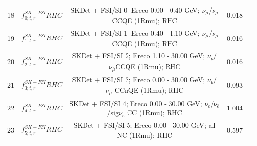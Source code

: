 {\begin{table}
\begin{tabular}{| c | c | c | c | c |}
18    &  $f_{0; t, r}^{SK+FSI}RHC$    & SKDet + FSI/SI  0; Ereco 0.00 - 0.40 GeV; $\nu_{\mu}$/$\nu_{\bar{\mu}}$ CCQE (1Rmu); RHC             & 0.018      \\ 
19    &  $f_{1; t, r}^{SK+FSI}RHC$    & SKDet + FSI/SI  1; Ereco  0.40 - 1.10 GeV; $\nu_{\mu}$/$\nu_{\bar{\mu}}$ CCQE (1Rmu); RHC             & 0.016      \\ 
20    &  $f_{2; t, r}^{SK+FSI}RHC$    & SKDet + FSI/SI  2; Ereco  1.10 - 30.00 GeV; $\nu_{\mu}$/$\nu_{\bar{\mu}}$CCQE (1Rmu); RHC            & 0.016      \\ 
21    &  $f_{3; t, r}^{SK+FSI}RHC$    & SKDet + FSI/SI  3; Ereco  0.00 - 30.00 GeV; $\nu_{\mu}$/$\nu_{\bar{\mu}}$ CCnQE (1Rmu); RHC           & 0.093      \\ 
22    &  $f_{4; t, r}^{SK+FSI}RHC$    & SKDet + FSI/SI  4; Ereco  0.00 - 30.00 GeV; $\nu_e$/$\nu_{\bar{e}}$/sig$\nu_e$ CC (1Rmu); RHC         & 1.004      \\ 
23     & $f_{5; t, r}^{SK+FSI}RHC$    & SKDet + FSI/SI  5; Ereco  0.00 - 30.00 GeV; all NC (1Rmu); RHC                       & 0.597      \\ 


\end{tabular}
\end{table}}
